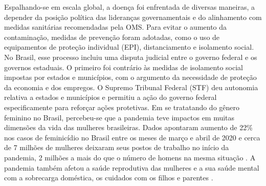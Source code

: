 Espalhando-se em escala global, a doença foi enfrentada de diversas maneiras, a depender da posição política das lideranças governamentais e do alinhamento com medidas sanitárias recomendadas pela OMS. Para evitar o aumento da contaminação, medidas de prevenção foram adotadas, como o uso de equipamentos de proteção individual (EPI), distanciamento e isolamento social. No Brasil, esse processo incluiu uma disputa judicial entre o governo federal e os governos estaduais. O primeiro foi contrário às medidas de isolamento social impostas por estados e municípios, com o argumento da necessidade de proteção da economia e dos empregos. O Supremo Tribunal Federal (STF) deu autonomia relativa a estados e municípios e permitiu a ação do governo federal especificamente para reforçar ações protetivas. Em se tratatando do gênero feminino no Brasil, percebeu-se que a pandemia teve impactos em muitas dimensões da vida das mulheres brasileiras. Dados apontaram aumento de 22\% nos casos de feminicídio no Brasil entre os meses de março e abril de 2020 e cerca de 7 milhões de mulheres deixaram seus postos de trabalho no início da pandemia, 2 milhões a mais do que o número de homens na mesma situação \cite{pandemia_impacta_mulheres}. A pandemia também afetou a saúde reprodutiva das mulheres e a sua saúde mental com a sobrecarga doméstica, os cuidados com os filhos e parentes \cite{pandemia_impacta_saude_mulheres}.


